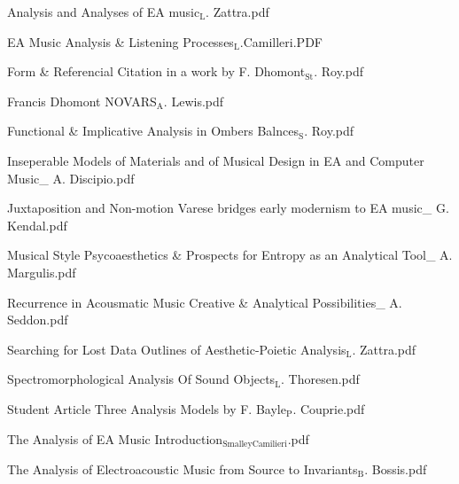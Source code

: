 \documentclass[11pt]{article}
\begin{document}
\item Analysis and Analyses of EA music$_{\text{L}}$. Zattra.pdf
\label{sec-1-1-1-1-49-1-1-6}

\item EA Music Analysis \& Listening Processes$_{\text{L}}$.Camilleri.PDF
\label{sec-1-1-1-1-49-1-1-7}

\item Form \& Referencial Citation in a work by F. Dhomont$_{\text{St}}$. Roy.pdf
\label{sec-1-1-1-1-49-1-1-8}

\item Francis Dhomont NOVARS$_{\text{A}}$. Lewis.pdf
\label{sec-1-1-1-1-49-1-1-9}

\item Functional \& Implicative Analysis in Ombers Balnces$_{\text{S}}$. Roy.pdf
\label{sec-1-1-1-1-49-1-1-10}

\item Inseperable Models of Materials and of Musical Design in EA and Computer Music\_ A. Discipio.pdf
\label{sec-1-1-1-1-49-1-1-11}

\item Juxtaposition and Non-motion Varese bridges early modernism to EA music\_ G. Kendal.pdf
\label{sec-1-1-1-1-49-1-1-12}

\item Musical Style Psycoaesthetics \& Prospects for Entropy as an Analytical Tool\_ A. Margulis.pdf
\label{sec-1-1-1-1-49-1-1-13}

\item Recurrence in Acousmatic Music Creative \& Analytical Possibilities\_ A. Seddon.pdf
\label{sec-1-1-1-1-49-1-1-14}

\item Searching for Lost Data Outlines of Aesthetic-Poietic Analysis$_{\text{L}}$. Zattra.pdf
\label{sec-1-1-1-1-49-1-1-15}

\item Spectromorphological Analysis Of Sound Objects$_{\text{L}}$. Thoresen.pdf
\label{sec-1-1-1-1-49-1-1-16}

\item Student Article Three Analysis Models by F. Bayle$_{\text{P}}$. Couprie.pdf
\label{sec-1-1-1-1-49-1-1-17}

\item The Analysis of EA Music Introduction$_{\text{SmalleyCamilieri}}$.pdf
\label{sec-1-1-1-1-49-1-1-18}

\item The Analysis of Electroacoustic Music from Source to Invariants$_{\text{B}}$. Bossis.pdf
\label{sec-1-1-1-1-49-1-1-19}
\end{document}
